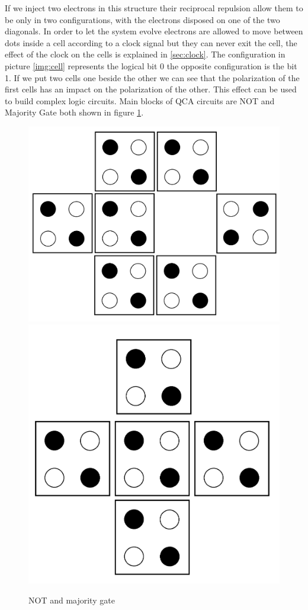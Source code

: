If we inject two electrons in this structure their reciprocal repulsion allow them to be only in two configurations, with the electrons disposed on one of the two diagonals. In order to let the system evolve electrons are allowed to move between dots inside a cell according to a clock signal but they can never exit the cell, the effect of the clock on the cells is explained in \ref{sec:clock}.
The configuration in picture \ref{img:cell} represents the logical bit 0 the opposite configuration is the bit 1. 
If we put two cells one beside the other we can see that the polarization of the first cells has an impact on the polarization of the other. This effect can be used to build complex logic circuits. Main blocks of QCA circuits are NOT and Majority Gate both shown in figure \ref{img:gates}.
\begin{figure}
\centering
\includegraphics[scale=0.1]{img/not_normal.png}
\includegraphics[scale=0.1]{img/majority.png}
\caption{NOT and majority gate}
\label{img:gates}
\end{figure}

